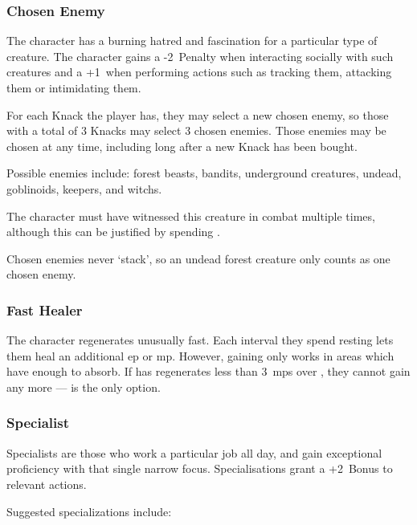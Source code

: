 \begin{multicols}{2}

\subsubsection{Chosen Enemy}

The character has a burning hatred and fascination for a particular type of creature.
The character gains a -2~Penalty when interacting socially with such creatures and a +1~when performing actions such as tracking them, attacking them or intimidating them.

For each Knack the player has, they may select a new chosen enemy, so those with a total of 3 Knacks may select 3 chosen enemies. Those enemies may be chosen at any time, including long after a new Knack has been bought.

Possible enemies include: forest beasts, bandits, underground creatures, undead, goblinoids, \glspl{keeper}, and \glspl{witch}.

The character must have witnessed this creature in combat multiple times, although this can be justified by spending .%

Chosen enemies never `stack', so an undead forest creature only counts as one chosen enemy.

\subsubsection{Fast Healer}

The character regenerates unusually fast.
Each \gls{interval} they spend resting lets them heal an additional \gls{ep} or \gls{mp}.
However, gaining  only works in \glspl{area} which have enough to absorb.
If  has regenerates less than 3~\glspl{mp} over , they cannot gain any more ---  is the only option.

\subsubsection{Specialist}
\label{specialist}

Specialists are those who work a particular job all day, and gain exceptional proficiency with that single narrow focus.
Specialisations grant a +2~Bonus to relevant actions.

Suggested specializations include:


\end{multicols}
